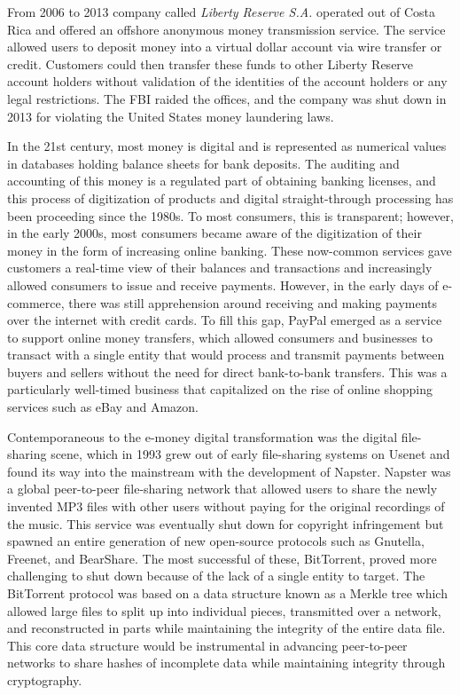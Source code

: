 
From 2006 to 2013 company called \textit{Liberty Reserve S.A.} operated out of
Costa Rica and offered an offshore anonymous money transmission
service. The service allowed users to deposit money into a virtual dollar
account via wire transfer or credit. Customers could then transfer these funds
to other Liberty Reserve account holders without validation of the identities of
the account holders or any legal restrictions. The FBI raided the offices, and
the company was shut down in 2013 for violating the United States money
laundering laws.


In the 21st century, most money is digital and is represented as numerical
values in databases holding balance sheets for bank deposits. The auditing and
accounting of this money is a regulated part of obtaining banking licenses, and
this process of digitization of products and digital straight-through processing
has been proceeding since the 1980s. To most consumers, this is transparent;
however, in the early 2000s, most consumers became aware of the digitization of
their money in the form of increasing online banking. These now-common services
gave customers a real-time view of their balances and transactions and
increasingly allowed consumers to issue and receive payments. However, in the
early days of e-commerce, there was still apprehension around receiving and
making payments over the internet with credit cards. To fill this gap, PayPal
emerged as a service to support online money transfers, which allowed consumers
and businesses to transact with a single entity that would process and transmit
payments between buyers and sellers without the need for direct bank-to-bank
transfers. This was a particularly well-timed business that capitalized on the
rise of online shopping services such as eBay and Amazon.


Contemporaneous to the e-money digital transformation was the digital
file-sharing scene, which in 1993 grew out of early file-sharing systems on
Usenet and found its way into the mainstream with the development of  Napster.
Napster was a global peer-to-peer file-sharing network that allowed users to
share the newly invented MP3 files with other users without paying for the
original recordings of the music. This service was eventually shut down for
copyright infringement but spawned an entire generation of new open-source
protocols such as Gnutella, Freenet, and BearShare. The most successful of
these, BitTorrent, proved more challenging to shut down because of the lack of a
single entity to target. The BitTorrent protocol was based on a data structure
known as a Merkle tree which allowed large files to split up into individual
pieces, transmitted over a network, and reconstructed in parts while maintaining
the integrity of the entire data file. This core data structure would be
instrumental in advancing peer-to-peer networks to share hashes of incomplete
data while maintaining integrity through cryptography.

